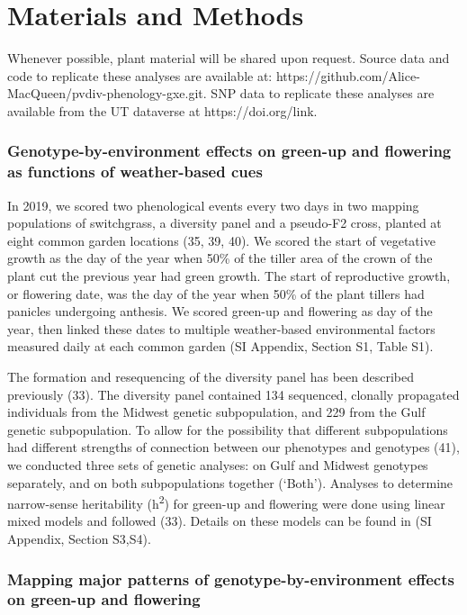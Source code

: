 \documentclass[
  9pt,
  twocolumn,
  twoside]{pnas-new}
\begin{document}
\section{Materials and Methods}\label{materials-and-methods}

Whenever possible, plant material will be shared upon request. Source
data and code to replicate these analyses are available at:
https://github.com/Alice-MacQueen/pvdiv-phenology-gxe.git. SNP data to
replicate these analyses are available from the UT dataverse at
https://doi.org/link.

\subsubsection{Genotype-by-environment effects on green-up and flowering
as functions of weather-based
cues}\label{genotype-by-environment-effects-on-green-up-and-flowering-as-functions-of-weather-based-cues}

In 2019, we scored two phenological events every two days in two mapping
populations of switchgrass, a diversity panel and a pseudo-F2 cross,
planted at eight common garden locations (35, 39, 40). We scored the
start of vegetative growth as the day of the year when 50\% of the
tiller area of the crown of the plant cut the previous year had green
growth. The start of reproductive growth, or flowering date, was the day
of the year when 50\% of the plant tillers had panicles undergoing
anthesis. We scored green-up and flowering as day of the year, then
linked these dates to multiple weather-based environmental factors
measured daily at each common garden (SI Appendix, Section S1, Table
S1).

The formation and resequencing of the diversity panel has been described
previously (33). The diversity panel contained 134 sequenced, clonally
propagated individuals from the Midwest genetic subpopulation, and 229
from the Gulf genetic subpopulation. To allow for the possibility that
different subpopulations had different strengths of connection between
our phenotypes and genotypes (41), we conducted three sets of genetic
analyses: on Gulf and Midwest genotypes separately, and on both
subpopulations together (`Both'). Analyses to determine narrow-sense
heritability (h\textsuperscript{2}) for green-up and flowering were done
using linear mixed models and followed (33). Details on these models can
be found in (SI Appendix, Section S3,S4).

\subsubsection{Mapping major patterns of genotype-by-environment effects
on green-up and
flowering}\label{mapping-major-patterns-of-genotype-by-environment-effects-on-green-up-and-flowering}
\end{document}
